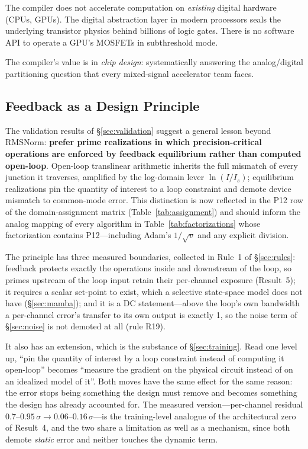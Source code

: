 \documentclass[11pt]{article}
\begin{document}
The compiler does not accelerate computation on \textit{existing} digital hardware (CPUs, GPUs). The digital abstraction layer in modern processors seals the underlying transistor physics behind billions of logic gates. There is no software API to operate a GPU's MOSFETs in subthreshold mode.

The compiler's value is in \textit{chip design}: systematically answering the analog/digital partitioning question that every mixed-signal accelerator team faces.

\subsection{Feedback as a Design Principle}

The validation results of \S\ref{sec:validation} suggest a general lesson beyond RMSNorm: \textbf{prefer prime realizations in which precision-critical operations are enforced by feedback equilibrium rather than computed open-loop}. Open-loop translinear arithmetic inherits the full mismatch of every junction it traverses, amplified by the log-domain lever $\ln(I/I_s)$; equilibrium realizations pin the quantity of interest to a loop constraint and demote device mismatch to common-mode error. This distinction is now reflected in the P12 row of the domain-assignment matrix (Table~\ref{tab:assignment}) and should inform the analog mapping of every algorithm in Table~\ref{tab:factorizations} whose factorization contains P12---including Adam's $1/\sqrt{v}$ and any explicit division.

The principle has three measured boundaries, collected in Rule~1 of \S\ref{sec:rules}: feedback protects exactly the operations inside and downstream of the loop, so primes upstream of the loop input retain their per-channel exposure (Result~5); it requires a scalar set-point to exist, which a selective state-space model does not have (\S\ref{sec:mamba}); and it is a DC statement---above the loop's own bandwidth a per-channel error's transfer to its own output is exactly 1, so the noise term of \S\ref{sec:noise} is not demoted at all (rule R19).

It also has an extension, which is the substance of \S\ref{sec:training}. Read one level up, ``pin the quantity of interest by a loop constraint instead of computing it open-loop'' becomes ``measure the gradient on the physical circuit instead of on an idealized model of it''. Both moves have the same effect for the same reason: the error stops being something the design must remove and becomes something the design has already accounted for. The measured version---per-channel residual $0.7$--$0.95\,\sigma \to 0.06$--$0.16\,\sigma$---is the training-level analogue of the architectural zero of Result~4, and the two share a limitation as well as a mechanism, since both demote \textit{static} error and neither touches the dynamic term.
\end{document}
